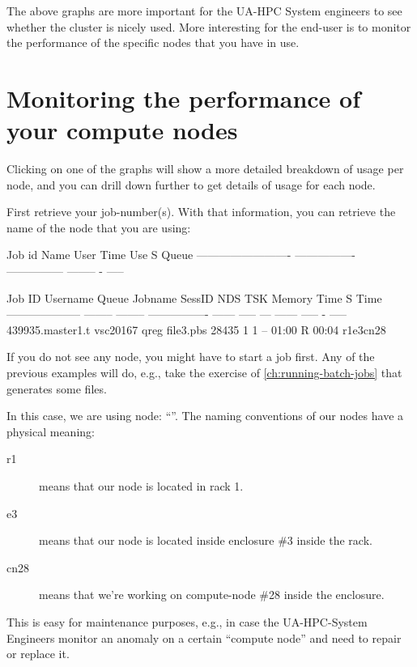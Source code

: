 The above graphs are more important for the UA-HPC System engineers to see
whether the cluster is nicely used. More interesting for the end-user is to
monitor the performance of the specific nodes that you have in use.

\section{Monitoring the performance of your compute nodes}

Clicking on one of the graphs will show a more detailed breakdown of usage per
node, and you can drill down further to get details of usage for each node.

First retrieve your job-number(s). With that information, you can retrieve the
name of the node that you are using:

\begin{prompt}
Job id                    Name             User            Time Use S Queue
------------------------- ---------------- --------------- -------- - -----

Job ID               Username Queue    Jobname          SessID NDS   TSK Memory Time  S Time
-------------------- -------- -------- ---------------- ------ ----- --- ------ ----- - -----
439935.master1.t     vsc20167 qreg     file3.pbs         28435     1   1    --  01:00 R 00:04
   r1e3cn28
\end{prompt}

If you do not see any node, you might have to start a job first. Any of the
previous examples will do, e.g., take the exercise of \autoref{ch:running-batch-jobs} that generates
some files.


In this case, we are using node: ``''.
The naming conventions of our nodes have a physical meaning:

\begin{description}
  \item[r1] means that our node is located in rack 1.
  \item[e3] means that our node is located inside enclosure \#3 inside the rack.
  \item[cn28] means that we're working on compute-node \#28 inside the enclosure.
\end{description}

This is easy for maintenance purposes, e.g., in case the UA-HPC-System
Engineers monitor an anomaly on a certain ``compute node'' and need to repair
or replace it.

